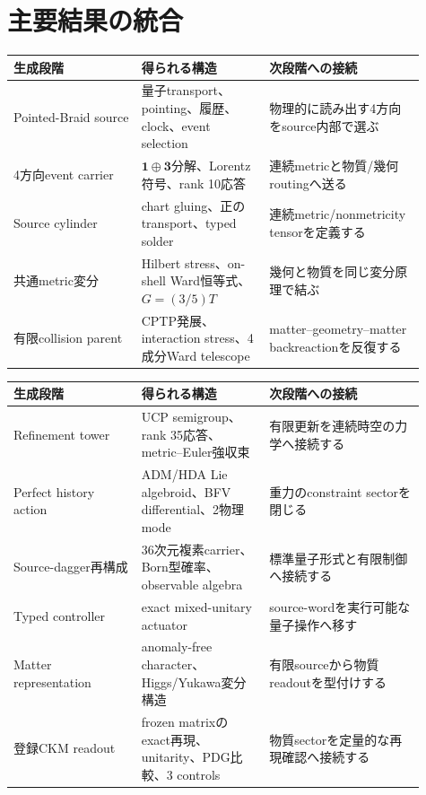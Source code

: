 \documentclass[11pt]{article}
\theoremstyle{definition}
\theoremstyle{remark}
\begin{document}
\section{主要結果の統合}

\begin{tabularx}{\linewidth}{>{\raggedright\arraybackslash}p{0.28\linewidth} >{\raggedright\arraybackslash}p{0.29\linewidth} >{\raggedright\arraybackslash}p{0.34\linewidth}}
\toprule
生成段階 & 得られる構造 & 次段階への接続 \\
\midrule
Pointed-Braid source & 量子transport、pointing、履歴、clock、event selection & 物理的に読み出す4方向をsource内部で選ぶ \\
4方向event carrier & $\mathbf1\oplus\mathbf3$分解、Lorentz符号、rank 10応答 & 連続metricと物質/幾何routingへ送る \\
Source cylinder & chart gluing、正のtransport、typed solder & 連続metric/nonmetricity tensorを定義する \\
共通metric変分 & Hilbert stress、on-shell Ward恒等式、$G=(3/5)T$ & 幾何と物質を同じ変分原理で結ぶ \\
有限collision parent & CPTP発展、interaction stress、4成分Ward telescope & matter--geometry--matter backreactionを反復する \\
\bottomrule
\end{tabularx}

\newpage
\begin{tabularx}{\linewidth}{>{\raggedright\arraybackslash}p{0.28\linewidth} >{\raggedright\arraybackslash}p{0.29\linewidth} >{\raggedright\arraybackslash}p{0.34\linewidth}}
\toprule
生成段階 & 得られる構造 & 次段階への接続 \\
\midrule
Refinement tower & UCP semigroup、rank 35応答、metric--Euler強収束 & 有限更新を連続時空の力学へ接続する \\
Perfect history action & ADM/HDA Lie algebroid、BFV differential、2物理mode & 重力のconstraint sectorを閉じる \\
Source-dagger再構成 & 36次元複素carrier、Born型確率、observable algebra & 標準量子形式と有限制御へ接続する \\
Typed controller & exact mixed-unitary actuator & source-wordを実行可能な量子操作へ移す \\
Matter representation & anomaly-free character、Higgs/Yukawa変分構造 & 有限sourceから物質readoutを型付けする \\
登録CKM readout & frozen matrixのexact再現、unitarity、PDG比較、3 controls & 物質sectorを定量的な再現確認へ接続する \\
\bottomrule
\end{tabularx}
\end{document}
